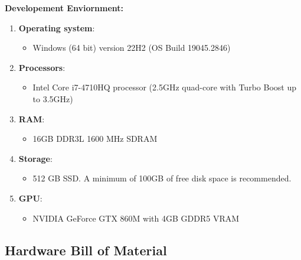  \textbf{Developement Enviornment:} 
\begin{enumerate}
	\item \textbf{Operating system}: 
	\begin{itemize}
		\item Windows (64 bit) version 22H2 (OS Build 19045.2846)
	\end{itemize}
	
	\item \textbf{Processors}:
	\begin{itemize}
		\item Intel Core i7-4710HQ processor (2.5GHz quad-core with Turbo Boost up to 3.5GHz)
	\end{itemize}
	
		\item \textbf{RAM}:
	\begin{itemize}
		\item 16GB DDR3L 1600 MHz SDRAM
	\end{itemize}

	\item \textbf{Storage}:
\begin{itemize}
	\item 512 GB SSD. A minimum of 100GB of free disk space is recommended.
\end{itemize}

	\item \textbf{GPU}:
\begin{itemize}
	\item NVIDIA GeForce GTX 860M with 4GB GDDR5 VRAM
\end{itemize}

\end{enumerate}


\subsection{Hardware Bill of Material}

\renewcommand{\arraystretch}{1.15}

